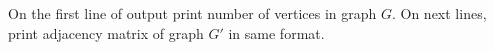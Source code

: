 On the first line of output print number of vertices in graph $G$.
On next lines, print adjacency matrix of graph $G'$ in same format.
